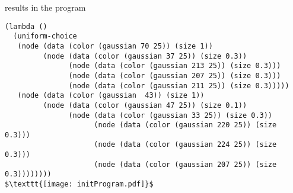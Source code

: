 \documentclass[a4paper,10pt]{article}
\begin{document}
results in the program 
\begin{lstlisting}[mathescape=true]
(lambda ()
  (uniform-choice
   (node (data (color (gaussian 70 25)) (size 1))
         (node (data (color (gaussian 37 25)) (size 0.3))
               (node (data (color (gaussian 213 25)) (size 0.3)))
               (node (data (color (gaussian 207 25)) (size 0.3)))
               (node (data (color (gaussian 211 25)) (size 0.3)))))
   (node (data (color (gaussian  43)) (size 1))
         (node (data (color (gaussian 47 25)) (size 0.1))
               (node (data (color (gaussian 33 25)) (size 0.3))
                     (node (data (color (gaussian 220 25)) (size 0.3)))
                     (node (data (color (gaussian 224 25)) (size 0.3)))
                     (node (data (color (gaussian 207 25)) (size 0.3))))))))
$\texttt{[image: initProgram.pdf]}$
\end{lstlisting}


\newpage
\end{document}
